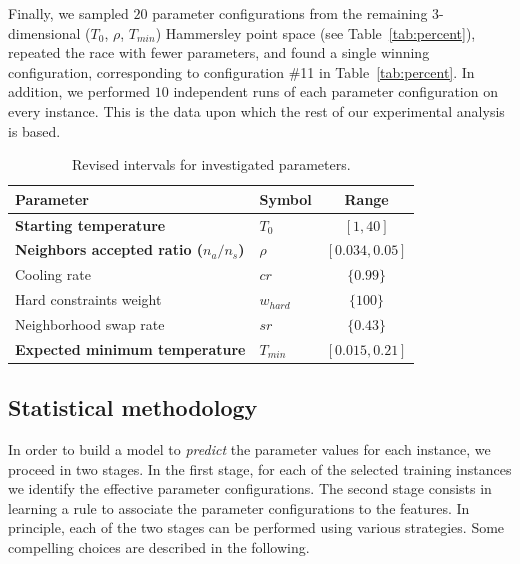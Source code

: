 \documentclass[authoryear,12pt]{article}
\begin{document}
Finally, we sampled $20$ parameter configurations from the remaining
3-dimensional ($T_{0}$, $\rho$, $T_{min}$) Hammersley point space (see
Table~\ref{tab:percent}), repeated the race with fewer parameters, and found a
single winning configuration, corresponding to configuration \#11 in
Table~\ref{tab:percent}. In addition, we performed $10$ independent runs of each
parameter configuration on every instance. This is the data upon which the rest
of our experimental analysis is based.

{
    \renewcommand{\arraystretch}{1.1}
    \renewcommand{\tabcolsep}{2pt}

    \begin{table}
        \caption{Revised intervals for investigated parameters\label{tab:refined}.}
        \centering
        \begin{tabular}{llc}
        \toprule
            Parameter                 & Symbol & Range     \\
            \midrule
            \textbf{Starting temperature}               & \textbf{$T_{0}$}        & \textbf{$[1, 40]$}         \\
            \textbf{Neighbors accepted ratio ($n_a/n_s$)} & \textbf{$\rho$}        & \textbf{$[0.034, 0.05]$}         \\
            Cooling rate                       & $cr$           & $\{0.99\}$       \\
            Hard constraints weight            & $w_{hard}$     & $\{100\}$            \\
            Neighborhood swap rate             & $sr$           & $\{0.43\}$         \\
            \textbf{Expected minimum temperature}       & \textbf{$T_{min}$}      & \textbf{$[0.015,0.21]$}   \\
    \bottomrule
        \end{tabular}
    \end{table}
}

\subsection{Statistical methodology}
\label{sec:statistical}

In order to build a model to \emph{predict} the parameter values for each
instance, we proceed in two stages. In the first stage, for each of the selected
training instances we identify the effective parameter configurations.  The
second stage consists in learning a rule to associate the parameter
configurations to the features. In principle, each of the two stages can be
performed using various strategies. Some compelling choices are described in the
following.
\end{document}
